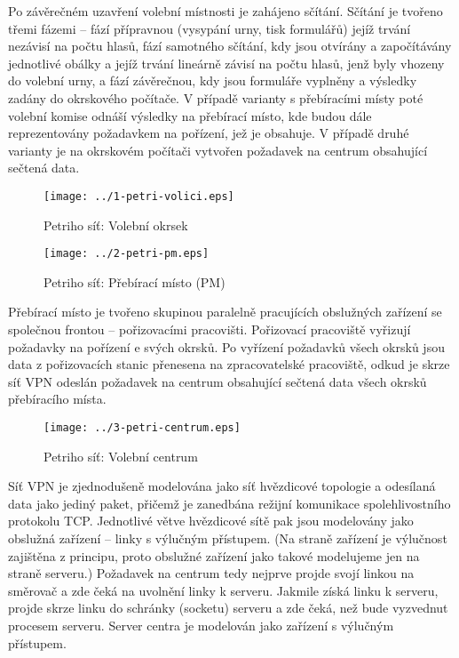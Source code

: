 \documentclass[12pt,a4paper,titlepage,final]{article}
\begin{document}
Po závěrečném uzavření volební místnosti je zahájeno sčítání. Sčítání je tvořeno třemi fázemi -- fází přípravnou (vysypání urny, tisk formulářů) jejíž trvání nezávisí na počtu hlasů, fází samotného sčítání, kdy jsou otvírány a započítávány jednotlivé obálky a jejíž trvání lineárně závisí na počtu hlasů, jenž byly vhozeny do volební urny, a fází závěrečnou, kdy jsou formuláře vyplněny a výsledky zadány do okrskového počítače. V případě varianty s přebíracími místy poté volební komise odnáší výsledky na přebírací místo, kde budou dále reprezentovány požadavkem na pořízení, jež je obsahuje. V případě druhé varianty je na okrskovém počítači vytvořen požadavek na centrum obsahující sečtená data.

\begin{figure}[H]
  \centering
  \texttt{[image: ../1-petri-volici.eps]}
  \caption{Petriho síť: Volební okrsek}
  \label{fig:1_petri_volici}
\end{figure}

\begin{figure}[H]
  \centering
  \texttt{[image: ../2-petri-pm.eps]}
  \caption{Petriho síť: Přebírací místo (PM)}
  \label{fig:2_petri_pm}
\end{figure}

Přebírací místo je tvořeno skupinou paralelně pracujících obslužných zařízení se společnou frontou -- pořizovacími pracovišti. Pořizovací pracoviště vyřizují požadavky na pořízení e svých okrsků. Po vyřízení požadavků všech okrsků jsou data z pořizovacích stanic přenesena na zpracovatelské pracoviště, odkud je skrze síť VPN odeslán požadavek na centrum obsahující sečtená data všech okrsků přebíracího místa.

\begin{figure}[H]
  \centering
  \texttt{[image: ../3-petri-centrum.eps]}
  \caption{Petriho síť: Volební centrum}
  \label{fig:3_petri_centrum}
\end{figure}

Síť VPN je zjednodušeně modelována jako síť hvězdicové topologie a odesílaná data jako jediný paket, přičemž je zanedbána režijní komunikace spolehlivostního protokolu TCP. Jednotlivé větve hvězdicové sítě pak jsou modelovány jako obslužná zařízení -- linky s výlučným přístupem. (Na straně zařízení je výlučnost zajištěna z principu, proto obslužné zařízení jako takové modelujeme jen na straně serveru.) Požadavek na centrum tedy nejprve projde svojí linkou na směrovač a zde čeká na uvolnění linky k serveru. Jakmile získá linku k serveru, projde skrze linku do schránky (socketu) serveru a zde čeká, než bude vyzvednut procesem serveru. Server centra je modelován jako zařízení s výlučným přístupem.
\end{document}
